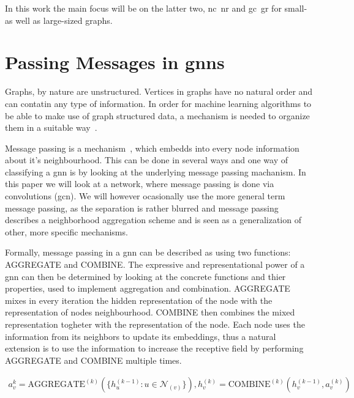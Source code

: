 In this work the main focus will be on the latter two, \ac{nc}\ \ac{nr} and \ac{gc}\
\ac{gr} for small- as well as large-sized graphs.

\section{Passing Messages in \Acsp*{gnn}}
\label{sec:related:message}

Graphs, by nature are unstructured. Vertices in graphs have no natural order and can
contatin any type of information. In order for machine learning algorithms to be able
to make use of graph structured data, a mechanism is needed to organize them in a
suitable way~\cite{Zhou2020a,Hamilton2017a,Zhang19}.


Message passing is a mechanism~\cite{Xu2019,Zhou2020a}, which embedds into every node information about it's neighbourhood.
This can be done in several ways and one way of classifying a \ac{gnn} is by looking at the
underlying message passing machanism. In this paper we will look at a network, where message passing is done
via convolutions (\acf{gcn}). We will however ocasionally use the more general term message passing, as
the separation is rather blurred and message passing describes a neighborhood aggregation scheme and
is seen as a generalization of other, more specific mechanisms.

Formally, message passing in a \ac{gnn} can be described as using two functions:
AGGREGATE and COMBINE. The expressive and representational power of a \ac{gnn} can
then be determined by looking at the concrete functions and thier properties, used to implement
aggregation and combination. AGGREGATE mixes in every iteration the hidden representation of the node
with the representation of nodes neighbourhood. COMBINE then combines the mixed representation togheter with the
representation of the node. Each node uses the information from its neighbors to update its embeddings, thus a natural
extension is to use the information to increase the receptive field by performing AGGREGATE and COMBINE multiple
times.

\begin{align*}
    a_{v}^{k} = \mathrm{AGGREGATE}^{(k)}(\{h_{u}^{(k-1)}: u \in \mathcal{N}_{(v)}\}) , h_{v}^{(k)} = \mathrm{COMBINE}^{(k)}(h_{v}^{(k-1)}, a_{v}^{(k)})
\end{align*}

